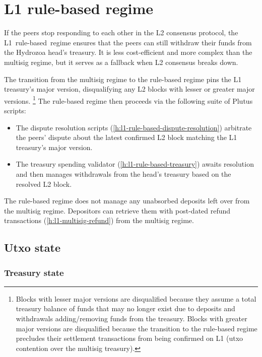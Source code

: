 \documentclass[../hydrozoa.tex]{subfiles}
\begin{document}
\chapter{L1 rule-based regime}%
\label{h:l1-rule-based-regime}%

If the peers stop responding to each other in the L2 consensus protocol, the L1~rule-based~regime ensures that the peers can still withdraw their funds from the Hydrozoa head's treasury.
It is less cost-efficient and more complex than the multisig regime, but it serves as a fallback when L2 consensus breaks down.

The transition from the multisig regime to the rule-based regime pins the L1 treasury's major version, disqualifying any L2 blocks with lesser or greater major versions.%
\footnote{Blocks with lesser major versions are disqualified because they assume a total treasury balance of funds that may no longer exist due to deposits and withdrawals adding/removing funds from the treasury.
  Blocks with greater major versions are disqualified because the transition to the rule-based regime precludes their settlement transactions from being confirmed on L1 (utxo contention over the multisig treasury).}
The rule-based regime then proceeds via the following suite of Plutus scripts:
\begin{itemize}
  \item The dispute resolution scripts (\cref{h:l1-rule-based-dispute-resolution}) arbitrate the peers' dispute about the latest confirmed L2 block matching the L1 treasury's major version.
  \item The treasury spending validator (\cref{h:l1-rule-based-treasury}) awaits resolution and then manages withdrawals from the head's treasury based on the resolved L2 block.
\end{itemize}

The rule-based regime does not manage any unabsorbed deposits left over from the multisig regime.
Depositors can retrieve them with post-dated refund transactions (\cref{h:l1-multisig-refund}) from the multisig regime.

\section{Utxo state}%
\label{h:l1-rule-based-utxo-state}%

\subsection{Treasury state}
\end{document}
